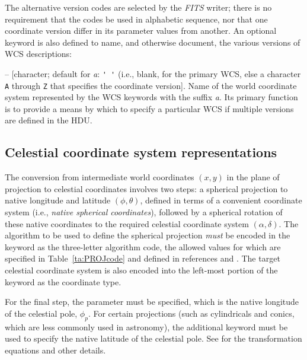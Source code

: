 \documentclass[onecolumn]{aa}
\begin{document}
The alternative version codes are selected by the {\em FITS\/} writer; there is no
requirement that the codes be used in alphabetic sequence, nor that one coordinate
version differ in its parameter values from another. An optional keyword
 is also defined to name, and otherwise document, the various
versions of WCS descriptions: 

\begin{description}

\item {}  -- [character; default for {\it a}: {\verb*+' '+} (i.e.,
blank, for the primary WCS, else a character {\tt A} through {\tt Z} that
specifies the coordinate version]. 
Name of the world coordinate system represented by
the WCS keywords with the suffix {\it a}. Its primary function is to provide a
means by which to specify a particular WCS if multiple versions are defined in the
HDU. 

\end{description}

\subsection{Celestial coordinate system representations}\label{sect:Celestkw}

The conversion from intermediate world coordinates $(x,y)$ in the plane of
projection to celestial coordinates involves two steps: a spherical projection to
native longitude and latitude $(\phi, \theta)$, defined in terms of a convenient
coordinate system (i.e., \textit{native spherical coordinates}), followed by a
spherical rotation of these native coordinates to the required celestial
coordinate system $(\alpha, \delta)$. The algorithm to be used to define the
spherical projection {\em must} be encoded in the  keyword as
the three-letter algorithm code, the allowed values for which are specified in
Table~\ref{ta:PROJcode} and defined in references \cite{calabretta02} and 
\cite{calabretta07}.
The target celestial coordinate system is also encoded into the
left-most portion of the  keyword as the coordinate type.

For the final step, the parameter  must be specified, which is the
native longitude of the celestial pole, $\phi_p$. For certain projections (such as
cylindricals and conics, which are less commonly used in astronomy), the
additional keyword  must be used to specify the native latitude of
the celestial pole. See \cite{calabretta02} for the transformation equations and other details. 
\end{document}
